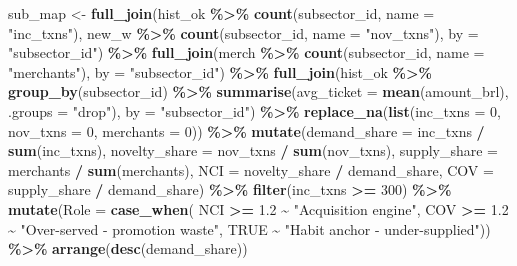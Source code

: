 \documentclass[
]{article}
\newenvironment{Shaded}{\begin{snugshade}}{\end{snugshade}}
\newcommand{\AttributeTok}[1]{\textcolor[rgb]{0.13,0.29,0.53}{#1}}
\newcommand{\ConstantTok}[1]{\textcolor[rgb]{0.56,0.35,0.01}{#1}}
\newcommand{\DecValTok}[1]{\textcolor[rgb]{0.00,0.00,0.81}{#1}}
\newcommand{\FloatTok}[1]{\textcolor[rgb]{0.00,0.00,0.81}{#1}}
\newcommand{\FunctionTok}[1]{\textcolor[rgb]{0.13,0.29,0.53}{\textbf{#1}}}
\newcommand{\NormalTok}[1]{#1}
\newcommand{\OtherTok}[1]{\textcolor[rgb]{0.56,0.35,0.01}{#1}}
\newcommand{\SpecialCharTok}[1]{\textcolor[rgb]{0.81,0.36,0.00}{\textbf{#1}}}
\newcommand{\StringTok}[1]{\textcolor[rgb]{0.31,0.60,0.02}{#1}}
\begin{document}
\begin{Shaded}
\begin{Highlighting}[]
\NormalTok{sub\_map }\OtherTok{\textless{}{-}} \FunctionTok{full\_join}\NormalTok{(hist\_ok }\SpecialCharTok{\%\textgreater{}\%} \FunctionTok{count}\NormalTok{(subsector\_id, }\AttributeTok{name =} \StringTok{"inc\_txns"}\NormalTok{),}
\NormalTok{                     new\_w   }\SpecialCharTok{\%\textgreater{}\%} \FunctionTok{count}\NormalTok{(subsector\_id, }\AttributeTok{name =} \StringTok{"nov\_txns"}\NormalTok{), }\AttributeTok{by =} \StringTok{"subsector\_id"}\NormalTok{) }\SpecialCharTok{\%\textgreater{}\%}
  \FunctionTok{full\_join}\NormalTok{(merch }\SpecialCharTok{\%\textgreater{}\%} \FunctionTok{count}\NormalTok{(subsector\_id, }\AttributeTok{name =} \StringTok{"merchants"}\NormalTok{), }\AttributeTok{by =} \StringTok{"subsector\_id"}\NormalTok{) }\SpecialCharTok{\%\textgreater{}\%}
  \FunctionTok{full\_join}\NormalTok{(hist\_ok }\SpecialCharTok{\%\textgreater{}\%} \FunctionTok{group\_by}\NormalTok{(subsector\_id) }\SpecialCharTok{\%\textgreater{}\%}
              \FunctionTok{summarise}\NormalTok{(}\AttributeTok{avg\_ticket =} \FunctionTok{mean}\NormalTok{(amount\_brl), }\AttributeTok{.groups =} \StringTok{"drop"}\NormalTok{), }\AttributeTok{by =} \StringTok{"subsector\_id"}\NormalTok{) }\SpecialCharTok{\%\textgreater{}\%}
  \FunctionTok{replace\_na}\NormalTok{(}\FunctionTok{list}\NormalTok{(}\AttributeTok{inc\_txns =} \DecValTok{0}\NormalTok{, }\AttributeTok{nov\_txns =} \DecValTok{0}\NormalTok{, }\AttributeTok{merchants =} \DecValTok{0}\NormalTok{)) }\SpecialCharTok{\%\textgreater{}\%}
  \FunctionTok{mutate}\NormalTok{(}\AttributeTok{demand\_share =}\NormalTok{ inc\_txns }\SpecialCharTok{/} \FunctionTok{sum}\NormalTok{(inc\_txns),}
         \AttributeTok{novelty\_share =}\NormalTok{ nov\_txns }\SpecialCharTok{/} \FunctionTok{sum}\NormalTok{(nov\_txns),}
         \AttributeTok{supply\_share =}\NormalTok{ merchants }\SpecialCharTok{/} \FunctionTok{sum}\NormalTok{(merchants),}
         \AttributeTok{NCI =}\NormalTok{ novelty\_share }\SpecialCharTok{/}\NormalTok{ demand\_share,}
         \AttributeTok{COV =}\NormalTok{ supply\_share }\SpecialCharTok{/}\NormalTok{ demand\_share) }\SpecialCharTok{\%\textgreater{}\%}
  \FunctionTok{filter}\NormalTok{(inc\_txns }\SpecialCharTok{\textgreater{}=} \DecValTok{300}\NormalTok{) }\SpecialCharTok{\%\textgreater{}\%}
  \FunctionTok{mutate}\NormalTok{(}\AttributeTok{Role =} \FunctionTok{case\_when}\NormalTok{(}
\NormalTok{    NCI }\SpecialCharTok{\textgreater{}=} \FloatTok{1.2}              \SpecialCharTok{\textasciitilde{}} \StringTok{"Acquisition engine"}\NormalTok{,}
\NormalTok{    COV }\SpecialCharTok{\textgreater{}=} \FloatTok{1.2}              \SpecialCharTok{\textasciitilde{}} \StringTok{"Over{-}served {-} promotion waste"}\NormalTok{,}
    \ConstantTok{TRUE}                    \SpecialCharTok{\textasciitilde{}} \StringTok{"Habit anchor {-} under{-}supplied"}\NormalTok{)) }\SpecialCharTok{\%\textgreater{}\%}
  \FunctionTok{arrange}\NormalTok{(}\FunctionTok{desc}\NormalTok{(demand\_share))}


\end{Highlighting}
\end{Shaded}
\end{document}
